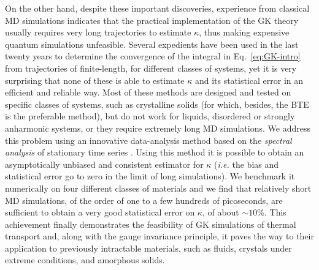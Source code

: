 On the other hand, despite these important discoveries, experience from classical MD simulations indicates that the practical implementation of the GK theory usually requires very long trajectories to estimate $\kappa$, thus making expensive quantum simulations unfeasible. 
Several expedients have been used in the last twenty years to determine the convergence of the integral in Eq.~\eqref{eq:GK-intro} from trajectories of finite-length, for different classes of systems, yet it is very surprising that none of these is able to estimate $\kappa$ and its statistical error in an efficient and reliable way. Most of these methods are designed and tested on specific classes of systems, such as crystalline solids (for which, besides, the BTE is the preferable method), but do not work for liquids, disordered or strongly anharmonic systems, or they require extremely long MD simulations. 
We address this problem using an innovative data-analysis method based on the \emph{spectral analysis} of stationary time series \cite{Ercole2017}. Using this method it is possible to obtain an asymptotically unbiased and consistent estimator for $\kappa$ (\emph{i.e.} the bias and statistical error go to zero in the limit of long simulations). We benchmark it numerically on four different classes of materials and we find that relatively short MD simulations, of the order of one to a few hundreds of picoseconds, are sufficient to obtain a very good statistical error on $\kappa$, of about $\sim 10\%$. 
This achievement finally demonstrates the feasibility of \abinitio GK simulations of thermal transport and, along with the gauge invariance principle, it paves the way to their application to previously intractable materials, such as fluids, crystals under extreme conditions, and amorphous solids. 


